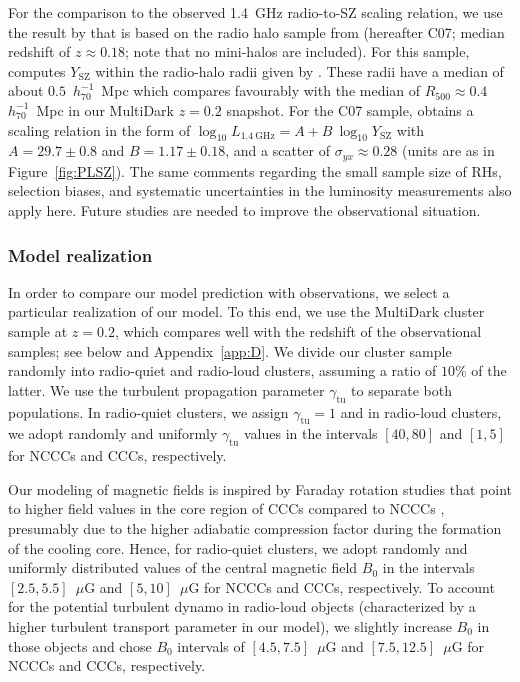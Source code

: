 \documentclass[traditabstract]{aa}
\newcommand{\rmn}{\mathrm}
\begin{document}
For the comparison to the observed 1.4~GHz radio-to-SZ scaling relation, we use
the result by \cite{2012MNRAS.421L.112B} that is based on the radio halo sample
from \cite{2007MNRAS.378.1565C} (hereafter C07; median redshift of $z \approx
0.18$; note that no mini-halos are included). For this sample,
\cite{2012MNRAS.421L.112B} computes $Y_{\rmn{SZ}}$ within the radio-halo radii
given by \cite{2007MNRAS.378.1565C}. These radii have a median of about
$0.5$~$h_{70}^{-1}$~Mpc which compares favourably with the median of $R_{500}
\approx 0.4$~$h_{70}^{-1}$~Mpc in our MultiDark $z = 0.2$ snapshot. For the C07
sample, \cite{2012MNRAS.421L.112B} obtains a scaling relation in the form of
$\log_{10} L_{1.4~\rmn{GHz}} = A + B~\log_{10} Y_{\rmn{SZ}}$ with $A=29.7\pm0.8$
and $B=1.17\pm0.18$, and a scatter of $\sigma_{yx} \approx 0.28$ (units are as
in Figure~\ref{fig:PLSZ}). The same comments regarding the small sample size of
RHs, selection biases, and systematic uncertainties in the luminosity
measurements also apply here. Future studies are needed to improve the
observational situation.


\subsubsection{Model realization}

In order to compare our model prediction with observations, we select a
particular realization of our model. To this end, we use the MultiDark cluster
sample at $z=0.2$, which compares well with the redshift of the observational
samples; see below and Appendix~\ref{app:D}. We divide our cluster sample
randomly into radio-quiet and radio-loud clusters, assuming a ratio of $10\%$ of
the latter. We use the turbulent propagation parameter $\gamma_{\rmn{tu}}$ to
separate both populations. In radio-quiet clusters, we assign
$\gamma_{\rmn{tu}}=1$ and in radio-loud clusters, we adopt randomly and
uniformly $\gamma_{\rmn{tu}}$ values in the intervals $[40,80]$ and $[1,5]$ for
NCCCs and CCCs, respectively.

Our modeling of magnetic fields is inspired by Faraday rotation studies that
point to higher field values in the core region of CCCs compared to NCCCs
\citep{2011A&A...529A..13K, 2010A&A...513A..30B}, presumably due to the higher
adiabatic compression factor during the formation of the cooling core. Hence,
for radio-quiet clusters, we adopt randomly and uniformly distributed values of
the central magnetic field $B_0$ in the intervals $[2.5,5.5]$~$\mu$G and
$[5,10]$~$\mu$G for NCCCs and CCCs, respectively. To account for the potential
turbulent dynamo in radio-loud objects (characterized by a higher turbulent
transport parameter in our model), we slightly increase $B_0$ in those objects
and chose $B_0$ intervals of $[4.5,7.5]$~$\mu$G and $[7.5,12.5]$~$\mu$G for
NCCCs and CCCs, respectively.
\end{document}
